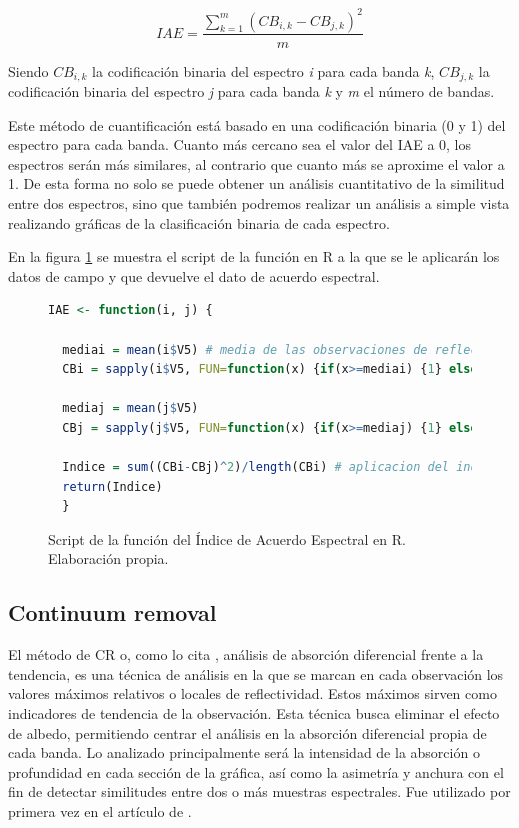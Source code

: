 \begin{equation} \label{eq:IAE}
	IAE = \frac{\displaystyle\sum_{k=1}^m(CB_{i,k} - CB_{j,k})^{2}}{m}
\end{equation}%

Siendo $CB_{i,k}$ la codificación binaria del espectro \textit{i} para cada banda \textit{k}, $CB_{j,k}$ la codificación binaria del espectro \textit{j} para cada banda \textit{k} y \textit{m} el número de bandas.%

Este método de cuantificación está basado en una codificación binaria (0 y 1) del espectro para cada banda. Cuanto más cercano sea el valor del \ac{IAE} a 0, los espectros serán más similares, al contrario que cuanto más se aproxime el valor a 1. De esta forma no solo se puede obtener un análisis cuantitativo de la similitud entre dos espectros, sino que también podremos realizar un análisis a simple vista realizando gráficas de la clasificación binaria de cada espectro.%

En la figura \ref{fig:IAE} se muestra el script de la función en R a la que se le aplicarán los datos de campo y que devuelve el dato de acuerdo espectral.

\begin{figure}
\centering
\begin{lstlisting}[language=R]
  IAE <- function(i, j) {
  
  mediai = mean(i$V5) # media de las observaciones de reflectividad
  CBi = sapply(i$V5, FUN=function(x) {if(x>=mediai) {1} else {0}}) # creacion de la codificacion binaria
  
  mediaj = mean(j$V5)
  CBj = sapply(j$V5, FUN=function(x) {if(x>=mediaj) {1} else {0}})
  	
  Indice = sum((CBi-CBj)^2)/length(CBi) # aplicacion del indice
  return(Indice)  
  }
\end{lstlisting}
\caption[Función de Índice de Acuerdo Espectral]{Script de la función del Índice de Acuerdo Espectral en R. Elaboración propia.}
\label{fig:IAE}
\end{figure}

\subsection{Continuum removal}
\label{subsec:Continuum_removal}

El método de \ac{CR} o, como lo cita \cite{chuvieco2002teledeteccion}, análisis de absorción diferencial frente a la tendencia, es una técnica de análisis en la que se marcan en cada observación los valores máximos relativos o locales de reflectividad. Estos máximos sirven como indicadores de tendencia de la observación. Esta técnica busca eliminar el efecto de albedo, permitiendo centrar el análisis en la absorción diferencial propia de cada banda. Lo analizado principalmente será la intensidad de la absorción o profundidad en cada sección de la gráfica, así como la asimetría y anchura con el fin de detectar similitudes entre dos o más muestras espectrales. Fue utilizado por primera vez en el artículo de \cite{kokaly1999spectroscopic}.%

